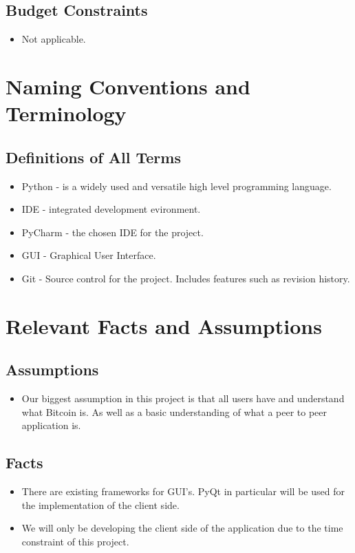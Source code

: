 \documentclass{article}
\begin{document}
\subsection{Budget Constraints}
\begin{itemize}
	
\item
Not applicable.
	
\end{itemize}

\section{Naming Conventions and Terminology}
\subsection{Definitions of All Terms}
\begin{itemize}
	
\item
Python - is a widely used and versatile high level programming language.
\item
IDE - integrated development evironment.
\item
PyCharm - the chosen IDE for the project.	
\item
GUI - Graphical User Interface.
\item
Git - Source control for the project. Includes features such as revision history.

\end{itemize}

\section{Relevant Facts and Assumptions}


\subsection{Assumptions}
\begin{itemize}
	
\item
Our biggest assumption in this project is that all users have and understand what Bitcoin is. As well as a basic understanding of what a peer to peer application is.
\end{itemize}

\subsection{Facts}
\begin{itemize}
	
\item
There are existing frameworks for GUI's. PyQt in particular will be used for the implementation of the client side. 
\item
We will only be developing the client side of the application due to the time constraint of this project.
	
\end{itemize} 
\end{document}
